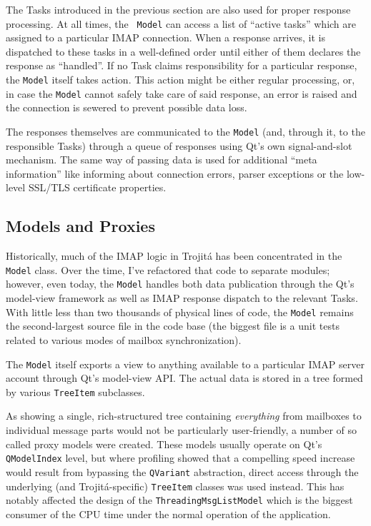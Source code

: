 \documentclass[trojita]{subfiles}
\begin{document}
The Tasks introduced in the previous section are also used for proper response processing.  At all times, the {\tt
Model} can access a list of ``active tasks'' which are assigned to a particular IMAP connection.  When a response
arrives, it is dispatched to these tasks in a well-defined order until either of them declares the response as
``handled''.  If no Task claims responsibility for a particular response, the {\tt Model} itself takes action.  This
action might be either regular processing, or, in case the {\tt Model} cannot safely take care of said response, an
error is raised and the connection is sewered to prevent possible data loss.

The responses themselves are communicated to the {\tt Model} (and, through it, to the responsible Tasks) through a queue
of responses using Qt's own signal-and-slot mechanism.  The same way of passing data is used for additional
``meta information'' like informing about connection errors, parser exceptions or the low-level SSL/TLS certificate
properties.

\subsection{Models and Proxies}

Historically, much of the IMAP logic in Trojitá has been concentrated in the {\tt Model} class.  Over the time, I've
refactored that code to separate modules; however, even today, the {\tt Model} handles both data publication through the
Qt's model-view framework as well as IMAP response dispatch to the relevant Tasks.  With little less than two thousands
of physical lines of code, the {\tt Model} remains the second-largest source file in the code base (the biggest file is
a unit tests related to various modes of mailbox synchronization).

The {\tt Model} itself exports a view to anything available to a particular IMAP server account through Qt's model-view
API.  The actual data is stored in a tree formed by various {\tt TreeItem} subclasses.

As showing a single, rich-structured tree containing {\em everything} from mailboxes to individual message parts would
not be particularly user-friendly, a number of so called proxy models were created.  These models usually operate on
Qt's {\tt QModelIndex} level, but where profiling showed that a compelling speed increase would result from bypassing
the {\tt QVariant} abstraction, direct access through the underlying (and Trojitá-specific) {\tt TreeItem} classes was
used instead.  This has notably affected the design of the {\tt ThreadingMsgListModel} which is the biggest consumer of
the CPU time under the normal operation of the application.
\end{document}
